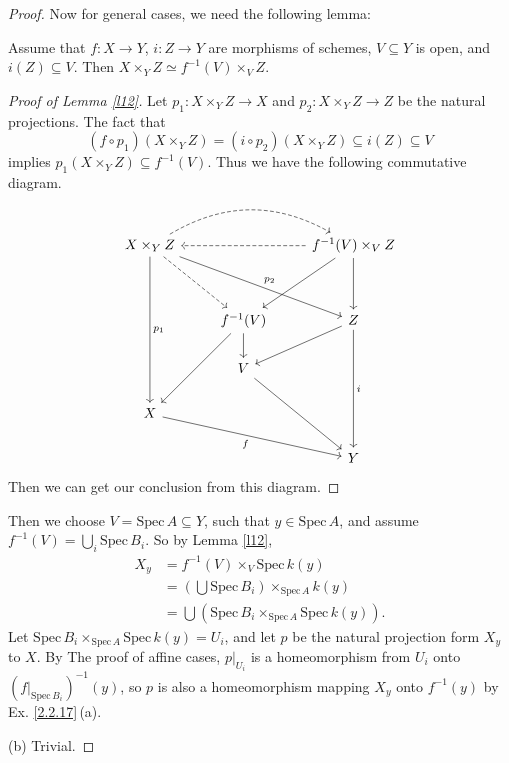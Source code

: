 \begin{proof}
	Now for general cases, we need the following lemma:
	\begin{lm}
		\label{l12}
		Assume that $f:X\rightarrow Y$, $i:Z\rightarrow Y$ are morphisms of schemes, $V\subseteq Y$ is open, and $i(Z)\subseteq V$. Then $X\times_YZ\simeq f^{-1}(V)\times_VZ$.
	\end{lm}
	\begin{proof}[Proof of Lemma \ref*{l12}]
		Let $p_1:X\times_YZ\to X$ and $p_2:X\times_YZ\to Z$ be the natural projections. The fact that $$(f\circ p_1)(X\times_YZ)=(i\circ p_2)(X\times_YZ)\subseteq i(Z)\subseteq V$$implies $p_1(X\times_YZ)\subseteq f^{-1}(V)$. Thus we have the following commutative diagram.
		\begin{equation*}
			\begin{tikzcd}
				X\times_YZ \arrow[dddd, "p_1"] \arrow[rrdd, "p_2"] \arrow[rdd, dashed] \arrow[rr, dashed, bend left] &                                 & f^{-1}(V)\times_VZ \arrow[ldd] \arrow[dd] \arrow[ll, dashed] \\
				&                                 &                                                              \\
				& f^{-1}(V) \arrow[ldd] \arrow[d] & Z \arrow[ddd, "i"] \arrow[ld]                                \\
				& V \arrow[rdd]                   &                                                              \\
				X \arrow[rrd, "f"']                                                                                  &                                 &                                                              \\
				&                                 & Y                                                           
			\end{tikzcd}
		\end{equation*}
		Then we can get our conclusion from this diagram.
	\end{proof}
	Then we choose $V=\mathrm{Spec}\, A\subseteq Y$, such that $y\in \mathrm{Spec}\, A$, and assume $f^{-1}(V)=\bigcup_i \mathrm{Spec}\, B_i$.
	So by Lemma \ref{l12},
	\begin{align*}
		X_y&=f^{-1}(V)\times_V\mathrm{Spec}\,k(y)\\
		&=\left(\bigcup \mathrm{Spec}\, B_i\right)\times_{\mathrm{Spec}\, A}k(y)\\
		&=\bigcup (\mathrm{Spec}\, B_i\times_{\mathrm{Spec}\, A}\mathrm{Spec}\,k(y)).
	\end{align*}
	Let $\mathrm{Spec}\, B_i\times_{\mathrm{Spec}\,A}\mathrm{Spec}\,k(y)=U_i$, and let $p$ be the natural
	projection form $X_y$ to $X$. By The proof of affine cases, $p|_{U_i}$ is a homeomorphism from $U_i$ onto $(f|_{\mathrm{Spec}\, B_i})^{-1}(y)$, so $p$ is also a homeomorphism mapping $X_y$ onto $f^{-1}(y)$ by Ex. \ref{2.2.17}\,(a).
	
	(b) Trivial.
\end{proof}
